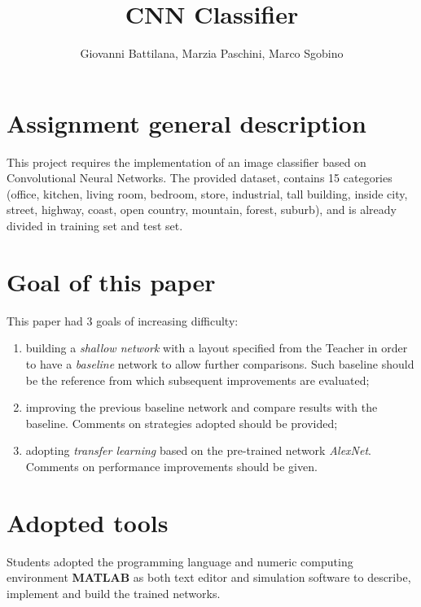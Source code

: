 \documentclass[a4paper, 11pt]{article} %
\begin{document}


\title{CNN Classifier}
\author{Giovanni Battilana, Marzia Paschini, Marco Sgobino}
\maketitle
\tableofcontents %

\section{Assignment general description}

This project requires the implementation of an image classifier based on Convolutional Neural Networks. The provided dataset\cite{dataset-url}, contains 15 categories (office, kitchen, living room, bedroom, store, industrial, tall building, inside city, street, highway, coast, open country, mountain, forest, suburb), and is already divided in training set and test set.


\section{Goal of this paper}

This paper had 3 goals of increasing difficulty:

\begin{enumerate}
    \item building a \emph{shallow network} with a layout specified from the Teacher in order to have a \emph{baseline} network to allow further comparisons. Such baseline should be the reference from which subsequent improvements are evaluated;
    \item improving the previous baseline network and compare results with the baseline. Comments on strategies adopted should be provided;
    \item adopting \emph{transfer learning} based on the pre-trained network \emph{AlexNet}. Comments on performance improvements should be given.
\end{enumerate}

\section{Adopted tools}

Students adopted the programming language and numeric computing environment \textbf{MATLAB} as both text editor and simulation software to describe, implement and build the trained networks. 
\end{document}
